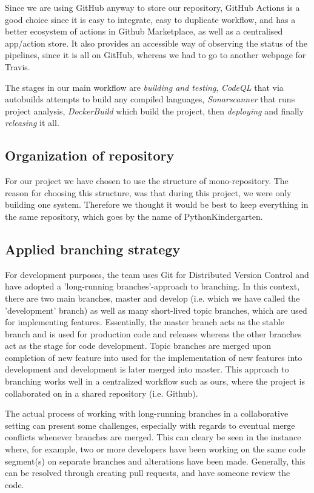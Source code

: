 Since we are using GitHub anyway to store our repository, GitHub Actions is a good choice since it is easy to 
integrate, easy to duplicate workflow, and has a better ecosystem of actions in Github Marketplace, as well as a centralised app/action store. 
It also provides an accessible way of observing the status of the pipelines, since it is all on GitHub, whereas we had to go to another webpage for Travis.  

The stages in our main workflow are \textit{building and testing}, \textit{CodeQL} that via autobuilds attempts to build any compiled languages, \textit{Sonarscanner} that runs project analysis, \textit{DockerBuild} which build the project, then \textit{deploying} and finally \textit{releasing} it all.\newline

\subsection{Organization of repository} %
For our project we have chosen to use the structure of mono-repository. 
The reason for choosing this structure, was that during this project, we were only building one system. 
Therefore we thought it would be best to keep everything in the same repository, which goes by the name of PythonKindergarten. \newline
  
  
\subsection{Applied branching strategy}
For development purposes, the team uses Git for Distributed Version Control and have adopted a 'long-running branches'-approach to branching. \cite{lecture02}
In this context, there are two main branches, master and develop (i.e. which we have called the 'development' branch) as well as many short-lived topic branches, 
which are used for implementing features. Essentially, the master branch acts as the stable branch and is used for production code and releases whereas the other branches act as the stage for code development. Topic branches are merged upon completion of new feature into used for the implementation of new features into development and development is later merged into master. This approach to branching works well in a centralized workflow such as ours, where the project is collaborated on in a shared repository (i.e. Github).

The actual process of working with long-running branches in a collaborative setting can present some challenges, especially with regards to eventual merge conflicts whenever branches are merged. 
This can cleary be seen in the instance where, for example, two or more developers have been working on the same code segment(s) on separate branches and alterations have been made. 
Generally, this can be resolved through creating pull requests, and have someone review the code.

